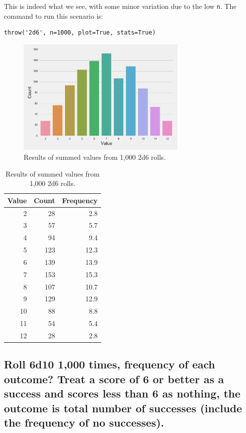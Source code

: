 \documentclass[twocolumn,letterpaper]{article}  %
\begin{document}
This is indeed what we see, with some minor variation due to the low \texttt{n}. The command to run this scenario is:

\begin{lstlisting}
throw('2d6', n=1000, plot=True, stats=True)
\end{lstlisting}

\begin{figure}[H]
\centering
\includegraphics[width=3.25in]{2d6.pdf}
\caption{Results of summed values from 1,000 2d6 rolls.}
\end{figure}

\begin{table}[H]
\begin{center}
\begin{tabular}{*{3}{r}}
\toprule
Value & Count & Frequency \\
\midrule
     2 &    28 &       2.8 \\
     3 &    57 &       5.7 \\
     4 &    94 &       9.4 \\
     5 &   123 &      12.3 \\
     6 &   139 &      13.9 \\
     7 &   153 &      15.3 \\
     8 &   107 &      10.7 \\
     9 &   129 &      12.9 \\
    10 &    88 &       8.8 \\
    11 &    54 &       5.4 \\
    12 &    28 &       2.8 \\
\bottomrule
\end{tabular}
\end{center}
\caption{Results of summed values from 1,000 2d6 rolls.}
\end{table}

\subsection{Roll 6d10 1,000 times, frequency of each outcome? Treat a score of 6 or better as a success and scores less than 6 as nothing, the outcome is total number of successes (include the frequency of no successes).}
\end{document}
